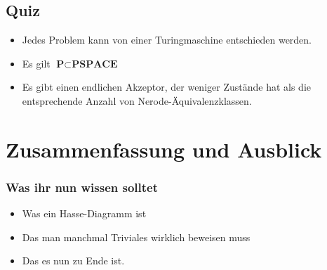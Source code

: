 





\graphicspath{{../figures/}}




\subsection{Quiz}
\begin{frame}
	\begin{itemize}
		\item<1-> Jedes Problem kann von einer Turingmaschine entschieden werden.
		\item<3-> Es gilt $ \textbf{P} \subset \textbf{PSPACE} $
		\item<5-> Es gibt einen endlichen Akzeptor, der weniger Zustände hat als die entsprechende Anzahl von Nerode-Äquivalenzklassen.
	\end{itemize}
\end{frame}





\appendix
\beginbackup

\section{Zusammenfassung und Ausblick}

\begin{frame}
	\frametitle{Was ihr nun wissen solltet}
	\begin{itemize}
		\item Was ein Hasse-Diagramm ist
		\item Das man manchmal Triviales wirklich beweisen muss
		\item Das es nun zu Ende ist.
	\end{itemize}
\end{frame}






\backupend

